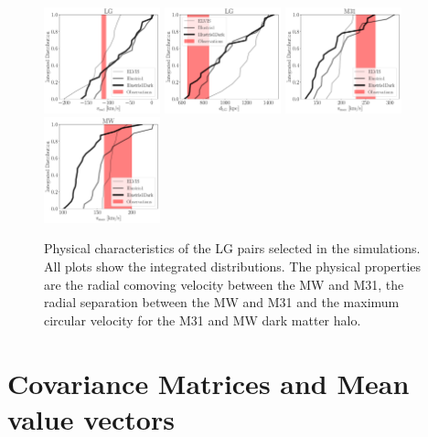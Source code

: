 \documentclass[a4paper,fleqn,usenatbib]{mnras}
\begin{document}
\begin{figure}
\centering
\includegraphics[width=0.30\textwidth]{int_distro_LG_v_rad.pdf}
\includegraphics[width=0.30\textwidth]{int_distro_LG_d.pdf}
\includegraphics[width=0.30\textwidth]{int_distro_M31_vmax.pdf}
\includegraphics[width=0.30\textwidth]{int_distro_MW_vmax.pdf}
\caption{Physical characteristics of the LG pairs selected in the
  simulations. All plots show the integrated distributions. The
  physical properties are the radial comoving velocity between the MW
  and M31, the radial separation between the MW and M31 and the
  maximum circular velocity for the M31 and MW dark matter halo.
\label{fig:physical_pairs}}
\end{figure}



\section{Covariance Matrices and Mean value vectors}
\label{appendix:covariance}
\end{document}
